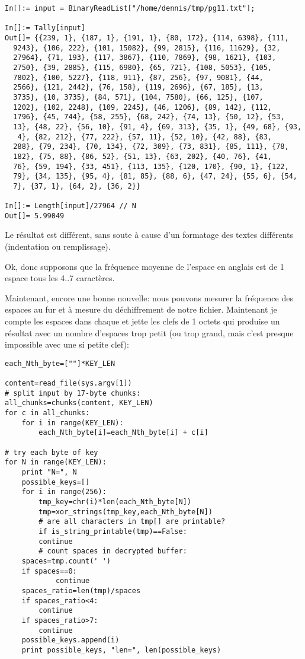 \begin{lstlisting}[caption=Mathematica,style=custommath]
In[]:= input = BinaryReadList["/home/dennis/tmp/pg11.txt"];

In[]:= Tally[input]
Out[]= {{239, 1}, {187, 1}, {191, 1}, {80, 172}, {114, 6398}, {111, 
  9243}, {106, 222}, {101, 15082}, {99, 2815}, {116, 11629}, {32, 
  27964}, {71, 193}, {117, 3867}, {110, 7869}, {98, 1621}, {103, 
  2750}, {39, 2885}, {115, 6980}, {65, 721}, {108, 5053}, {105, 
  7802}, {100, 5227}, {118, 911}, {87, 256}, {97, 9081}, {44, 
  2566}, {121, 2442}, {76, 158}, {119, 2696}, {67, 185}, {13, 
  3735}, {10, 3735}, {84, 571}, {104, 7580}, {66, 125}, {107, 
  1202}, {102, 2248}, {109, 2245}, {46, 1206}, {89, 142}, {112, 
  1796}, {45, 744}, {58, 255}, {68, 242}, {74, 13}, {50, 12}, {53, 
  13}, {48, 22}, {56, 10}, {91, 4}, {69, 313}, {35, 1}, {49, 68}, {93,
   4}, {82, 212}, {77, 222}, {57, 11}, {52, 10}, {42, 88}, {83, 
  288}, {79, 234}, {70, 134}, {72, 309}, {73, 831}, {85, 111}, {78, 
  182}, {75, 88}, {86, 52}, {51, 13}, {63, 202}, {40, 76}, {41, 
  76}, {59, 194}, {33, 451}, {113, 135}, {120, 170}, {90, 1}, {122, 
  79}, {34, 135}, {95, 4}, {81, 85}, {88, 6}, {47, 24}, {55, 6}, {54, 
  7}, {37, 1}, {64, 2}, {36, 2}}

In[]:= Length[input]/27964 // N
Out[]= 5.99049
\end{lstlisting}

Le résultat est différent, sans soute à cause d'un formatage des textes différents
(indentation ou remplissage).

Ok, donc supposons que la fréquence moyenne de l'espace en anglais est de 1 espace
tous les 4..7 caractères.

Maintenant, encore une bonne nouvelle: nous pouvons mesurer la fréquence des espaces
au fur et à mesure du déchiffrement de notre fichier.
Maintenant je compte les espaces dans chaque  et jette les clefs de 1 octets
qui produise un résultat avec un nombre d'espaces trop petit (ou trop grand, mais
c'est presque impossible avec une si petite clef):

\begin{lstlisting}[caption=Python script,style=custompy]
each_Nth_byte=[""]*KEY_LEN

content=read_file(sys.argv[1])
# split input by 17-byte chunks:
all_chunks=chunks(content, KEY_LEN)
for c in all_chunks:
    for i in range(KEY_LEN):
        each_Nth_byte[i]=each_Nth_byte[i] + c[i]

# try each byte of key
for N in range(KEY_LEN):
    print "N=", N
    possible_keys=[]
    for i in range(256):
        tmp_key=chr(i)*len(each_Nth_byte[N])
        tmp=xor_strings(tmp_key,each_Nth_byte[N])
        # are all characters in tmp[] are printable?
        if is_string_printable(tmp)==False:
	    continue
        # count spaces in decrypted buffer:
	spaces=tmp.count(' ')
	if spaces==0:
            continue
	spaces_ratio=len(tmp)/spaces
	if spaces_ratio<4:
	    continue
	if spaces_ratio>7:
	    continue
	possible_keys.append(i)
    print possible_keys, "len=", len(possible_keys)
\end{lstlisting}

